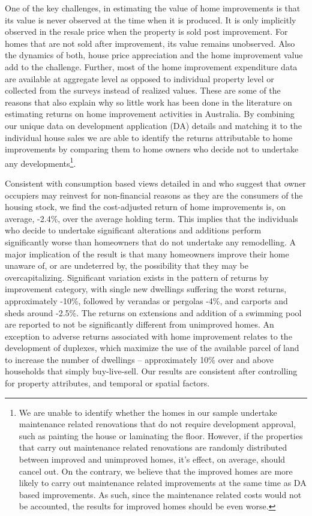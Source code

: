 \documentclass[AEJ,reqno, draftmode]{AEA} %
\begin{document}
One of the key challenges, in estimating the value of home improvements is that its value is never observed at the time when it is produced. It is only implicitly observed in the resale price when the property is sold post improvement. For homes that are not sold after improvement, its value remains unobserved. Also the dynamics of both, house price appreciation and the home improvement value add to the challenge. Further, most of the home improvement expenditure data are available at aggregate level as opposed to individual property level or collected from the surveys instead of realized values. These are some of the reasons that also explain why so little work has been done in the literature on estimating returns on home improvement activities in Australia. By combining our unique data on development application (DA) details and matching it to the individual house sales we are able to identify the returns attributable to home improvements by comparing them to home owners who decide not to undertake any developments\footnote{We are unable to identify whether the homes in our sample undertake maintenance related renovations that do not require development approval, such as painting the house or laminating the floor. However, if the properties that carry out maintenance related renovations are randomly distributed between improved and unimproved homes, it's effect, on average, should cancel out. On the contrary, we believe that the improved homes are more likely to carry out maintenance related improvements at the same time as DA based improvements. As such, since the maintenance related costs would not be accounted, the results for improved homes should be even worse.}.


Consistent with consumption based views detailed in \citet{choi2014speculating} and \citet{gyourko2004reinvestment} who suggest that owner occupiers may reinvest for non-financial reasons as they are the consumers of the housing stock, we find the cost-adjusted return of home improvements is, on average, -2.4\%, over the average holding term. This implies that the individuals who decide to undertake significant alterations and additions perform significantly worse than homeowners that do not undertake any remodelling. A major implication of the result is that many homeowners improve their home unaware of, or are undeterred by, the possibility that they may be overcapitalizing. Significant variation exists in the pattern of returns by improvement category, with single new dwellings suffering the worst returns, approximately -10\%, followed by verandas or pergolas -4\%, and carports and sheds around -2.5\%. The returns on extensions and addition of a swimming pool are reported to not be significantly different from unimproved homes. An exception to adverse returns associated with home improvement relates to the development of duplexes, which maximize the use of the available parcel of land to increase the number of dwellings -- approximately 10\% over and above households that simply buy-live-sell. Our results are consistent after controlling for property attributes, and temporal or spatial factors.
\end{document}

